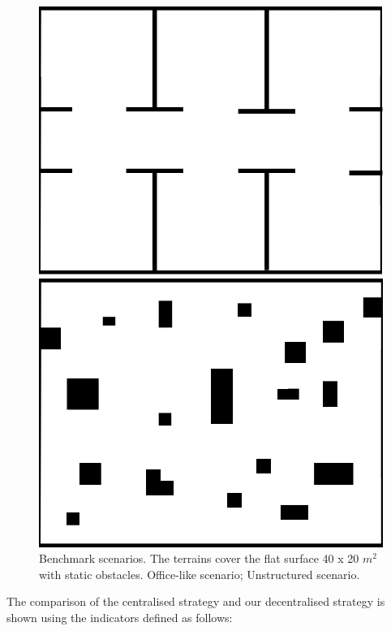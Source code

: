 \documentclass[letterpaper, 10 pt, conference]{ieeeconf}  %
\begin{document}
\begin{figure}[t]
	\centering
	\begin{minipage}{\dimexpr.48\columnwidth}
		\centering
		\includegraphics[width=\columnwidth]{office1.png}
		\captionsetup{labelformat=empty}
		\caption*{}
		\label{fig:office}
	\end{minipage}%
	\hspace{0.1cm}%
	\begin{minipage}{\dimexpr.48\columnwidth}
		\centering
		\includegraphics[width=\columnwidth]{unstructured.png}
		\captionsetup{labelformat=empty}
		\caption*{}
		\label{fig:unstructured}
	\end{minipage}
 \caption{Benchmark scenarios. The terrains cover the flat surface 40 x 20 $m^{2}$ with static obstacles.  Office-like scenario;  Unstructured scenario. }
 \label{fig:scenarios}
\end{figure}
The comparison of the centralised strategy and our decentralised strategy is shown using the indicators defined as follows:
\end{document}

